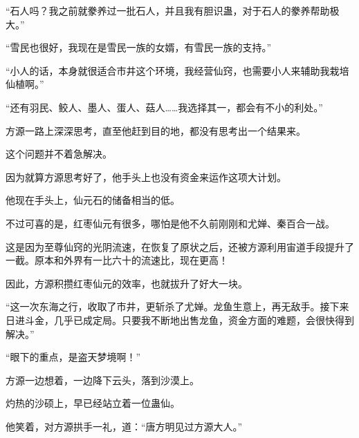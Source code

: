 \begin{this_body}
“石人吗？我之前就豢养过一批石人，并且我有胆识蛊，对于石人的豢养帮助极大。”

“雪民也很好，我现在是雪民一族的女婿，有雪民一族的支持。”

“小人的话，本身就很适合市井这个环境，我经营仙窍，也需要小人来辅助我栽培仙植啊。”

“还有羽民、鲛人、墨人、蛋人、菇人……我选择其一，都会有不小的利处。”

方源一路上深深思考，直至他赶到目的地，都没有思考出一个结果来。

这个问题并不着急解决。

因为就算方源思考好了，他手头上也没有资金来运作这项大计划。

他现在手头上，仙元石的储备相当的低。

不过可喜的是，红枣仙元有很多，哪怕是他不久前刚刚和尤婵、秦百合一战。

这是因为至尊仙窍的光阴流速，在恢复了原状之后，还被方源利用宙道手段提升了一截。原本和外界有一比六十的流速比，现在更高！

因此，方源积攒红枣仙元的效率，也就拔升了好大一块。

“这一次东海之行，收取了市井，更斩杀了尤婵。龙鱼生意上，再无敌手。接下来日进斗金，几乎已成定局。只要我不断地出售龙鱼，资金方面的难题，会很快得到解决。”

“眼下的重点，是盗天梦境啊！”

方源一边想着，一边降下云头，落到沙漠上。

灼热的沙硕上，早已经站立着一位蛊仙。

他笑着，对方源拱手一礼，道：“唐方明见过方源大人。”

\end{this_body}

